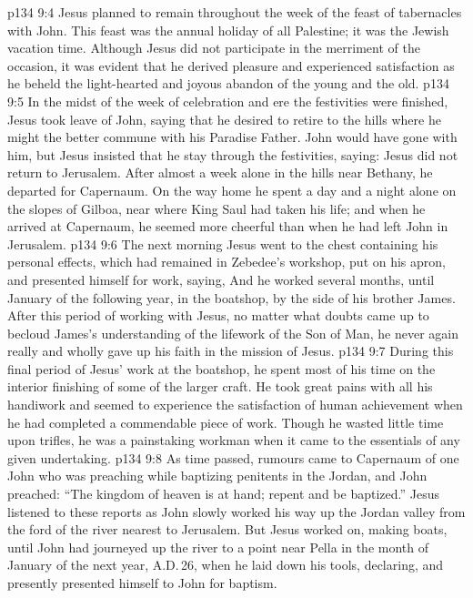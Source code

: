 \vs p134 9:4 Jesus planned to remain throughout the week of the feast of tabernacles with John. This feast was the annual holiday of all Palestine; it was the Jewish vacation time. Although Jesus did not participate in the merriment of the occasion, it was evident that he derived pleasure and experienced satisfaction as he beheld the light\hyp{}hearted and joyous abandon of the young and the old.
\vs p134 9:5 In the midst of the week of celebration and ere the festivities were finished, Jesus took leave of John, saying that he desired to retire to the hills where he might the better commune with his Paradise Father. John would have gone with him, but Jesus insisted that he stay through the festivities, saying:  Jesus did not return to Jerusalem. After almost a week alone in the hills near Bethany, he departed for Capernaum. On the way home he spent a day and a night alone on the slopes of Gilboa, near where King Saul had taken his life; and when he arrived at Capernaum, he seemed more cheerful than when he had left John in Jerusalem.
\vs p134 9:6 The next morning Jesus went to the chest containing his personal effects, which had remained in Zebedee’s workshop, put on his apron, and presented himself for work, saying,  And he worked several months, until January of the following year, in the boatshop, by the side of his brother James. After this period of working with Jesus, no matter what doubts came up to becloud James’s understanding of the lifework of the Son of Man, he never again really and wholly gave up his faith in the mission of Jesus.
\vs p134 9:7 During this final period of Jesus’ work at the boatshop, he spent most of his time on the interior finishing of some of the larger craft. He took great pains with all his handiwork and seemed to experience the satisfaction of human achievement when he had completed a commendable piece of work. Though he wasted little time upon trifles, he was a painstaking workman when it came to the essentials of any given undertaking.
\vs p134 9:8 \pc As time passed, rumours came to Capernaum of one John who was preaching while baptizing penitents in the Jordan, and John preached: “The kingdom of heaven is at hand; repent and be baptized.” Jesus listened to these reports as John slowly worked his way up the Jordan valley from the ford of the river nearest to Jerusalem. But Jesus worked on, making boats, until John had journeyed up the river to a point near Pella in the month of January of the next year, A.D.\,26, when he laid down his tools, declaring,  and presently presented himself to John for baptism.
